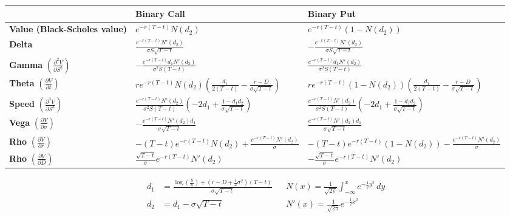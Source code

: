 \begin{center}
    \begin{tabularx}{\textwidth}{|X|X|X|}
        \hline
        & \textbf{Binary Call} & \textbf{Binary Put} \\
        \hline
        \textbf{Value (Black-Scholes value)} & $ e^{-r(T-t)} N(d_2) $ & $ e^{-r(T-t)} (1 - N(d_2)) $ \\
        \hline
        \textbf{Delta } & $ \frac{e^{-r(T-t)} N'(d_2)}{\sigma S \sqrt{T - t}} $ & $ -\frac{e^{-r(T-t)} N'(d_2)}{\sigma S \sqrt{T - t}} $ \\
        \hline
        \textbf{Gamma } $\left( \frac{\partial^2 V}{\partial S^2} \right)$ & $ -\frac{e^{-r(T-t)} d_1 N'(d_2)}{\sigma^2 S (T - t)} $ & $ \frac{e^{-r(T-t)} d_1 N'(d_2)}{\sigma^2 S (T - t)} $ \\
        \hline
        \textbf{Theta } $\left( \frac{\partial V}{\partial t} \right)$ & $ r e^{-r(T-t)} N(d_2) \left( \frac{d_1}{2 (T - t)} - \frac{r - D}{\sigma \sqrt{T - t}} \right) $ & $ r e^{-r(T-t)} (1 - N(d_2)) \left( \frac{d_1}{2 (T - t)} - \frac{r - D}{\sigma \sqrt{T - t}} \right) $ \\
        \hline
        \textbf{Speed } $\left( \frac{\partial^3 V}{\partial S^3} \right)$ & $ \frac{e^{-r(T-t)} N'(d_2)}{\sigma^2 S (T - t)} \left( -2 d_1 + \frac{1 - d_1 d_2}{\sigma \sqrt{T - t}} \right) $ & $ \frac{e^{-r(T-t)} N'(d_2)}{\sigma^2 S (T - t)} \left( -2 d_1 + \frac{1 - d_1 d_2}{\sigma \sqrt{T - t}} \right) $ \\
        \hline
        \textbf{Vega } $\left( \frac{\partial V}{\partial \sigma} \right)$ & $ -\frac{e^{-r(T-t)} N'(d_2) d_1}{\sigma \sqrt{T - t}} $ & $ \frac{e^{-r(T-t)} N'(d_2) d_1}{\sigma \sqrt{T - t}} $ \\
        \hline
        \textbf{Rho } $\left( \frac{\partial V}{\partial r} \right)$ & $ -(T - t) e^{-r(T-t)} N(d_2) + \frac{e^{-r(T-t)} N'(d_2)}{\sigma} $ & $ -(T - t) e^{-r(T-t)} (1 - N(d_2)) - \frac{e^{-r(T-t)} N'(d_2)}{\sigma} $ \\
        \hline
        \textbf{Rho } $\left( \frac{\partial V}{\partial D} \right)$ & $ \frac{\sqrt{T - t}}{\sigma} e^{-r(T-t)} N'(d_2) $ & $ -\frac{\sqrt{T - t}}{\sigma} e^{-r(T-t)} N'(d_2) $ \\
        \hline
    \end{tabularx}
\end{center}
\begin{align*}
    d_1 &= \frac{\log \left( \frac{S}{E} \right) + \left( r - D + \frac{1}{2} \sigma^2 \right) (T - t)}{\sigma \sqrt{T - t}} && N(x) = \frac{1}{\sqrt{2 \pi}} \int_{-\infty}^x e^{- \frac{1}{2} y^2} \, dy \\
    d_2 &= d_1 - \sigma \sqrt{T - t} &&  N'(x) = \frac{1}{\sqrt{2 \pi}} e^{- \frac{1}{2} x^2}
\end{align*}





